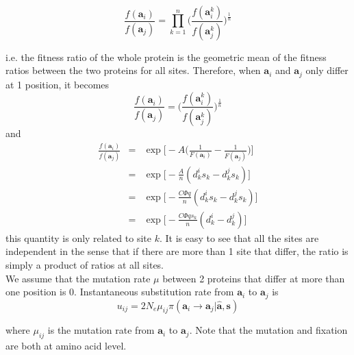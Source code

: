 \documentclass[13pt]{article}
\begin{document}
\begin{equation}
\frac{f(\mathbf{a}_i)}{f(\mathbf{a}_j)} = \prod_{k=1}^n\Big( \frac{f(\mathbf{a}_i^k)}{f(\mathbf{a}_j^k)}\Big)^{\frac{1}{n}}
\end{equation}


i.e. the fitness ratio of the whole protein is the geometric mean of the fitness ratios between the two proteins for all sites. Therefore, when $\mathbf{a}_i$ and $\mathbf{a}_j$ only differ at 1 position, it becomes  
\[\frac{f(\mathbf{a}_i)}{f(\mathbf{a}_j)} = \Big( \frac{f(\mathbf{a}_i^k)}{f(\mathbf{a}_j^k)}\Big)^{\frac{1}{n}}\]
and
\begin{eqnarray}
\frac{f(\mathbf{a}_i)}{f(\mathbf{a}_j)} & = &\exp \Big[-A\Big( \frac{1}{F(\mathbf{a}_i )} - \frac{1}{F(\mathbf{a}_j )}\Big)\Big] \nonumber\\
& = & \exp\Big[ -\frac{A}{n}(d_k^i s_k - d_k^j s_k)\Big]\\
& = & \exp\Big[ -\frac{C\Phi q}{n}(d_k^i s_k - d_k^j s_k)\Big]\\
& = & \exp\Big[ -\frac{C\Phi q s_k}{n}(d_k^i - d_k^j)\Big]
\end{eqnarray}
\noindent
this quantity is only related to site $k$. It is easy to see that all the sites are independent in the sense that if there are more than 1 site that differ, the ratio is simply a product of ratios at all sites. \\

We assume that the mutation rate $\mu$ between 2 proteins that differ at more than one position is 0. Instantaneous substitution rate from $\mathbf{a}_i$ to $\mathbf{a}_j$ is 
\begin{equation}
u_{ij} = 2N_e \mu_{ij} \pi(\mathbf{a}_i \rightarrow \mathbf{a}_j | \hat{\mathbf{a}}, \mathbf{s})
\label{eq:subrate}
\end{equation}

where $\mu_{ij}$ is the mutation rate from $\mathbf{a}_i$ to $\mathbf{a}_j$. Note that the mutation and fixation are both at amino acid level. \\
\end{document}
